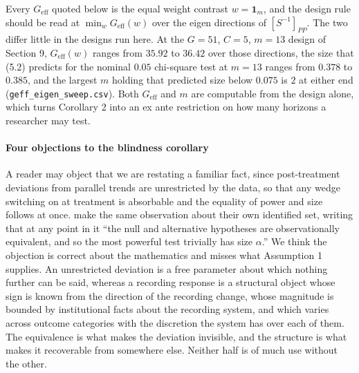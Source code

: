 \documentclass[12pt]{article}
\theoremstyle{definition}
\numberwithin{equation}{section}
\begin{document}
Every $G_{\mathrm{eff}}$ quoted below is the equal weight contrast
$w = \mathbf{1}_m$, and the design rule should be read at
$\min_w G_{\mathrm{eff}}(w)$ over the eigen directions of $[S^{-1}]_{PP}$. The
two differ little in the designs run here. At the $G = 51$, $C = 5$, $m = 13$
design of Section 9, $G_{\mathrm{eff}}(w)$ ranges from $35.92$ to
$36.42$ over those directions, the size that (5.2) predicts for the
nominal $0.05$ chi-square test at $m = 13$ ranges from $0.378$ to $0.385$, and
the largest $m$ holding that predicted size below $0.075$ is $2$ at either end
(\texttt{geff\_eigen\_sweep.csv}). Both $G_{\mathrm{eff}}$ and $m$ are
computable from the design alone, which
turns Corollary 2 into an ex ante restriction on how many horizons
a researcher may test.

\paragraph{Four objections to the blindness corollary}

A reader may object that we are restating a familiar fact, since post-treatment deviations from parallel trends are unrestricted by the data, so that any wedge
switching on at treatment is absorbable and the equality of power and size
follows at once. \citet{rambachan2023credible} make the same observation about their own
identified set, writing that at any point in it ``the null and alternative
hypotheses are observationally equivalent, and so the most powerful test trivially
has size $\alpha$.'' We think the objection is correct about the mathematics and misses what
Assumption 1 supplies. An unrestricted deviation is a free parameter
about which nothing further can be said, whereas a recording response is a
structural object whose sign is known from the direction of the recording
change, whose magnitude is bounded by institutional facts about the recording
system, and which varies across outcome categories with the discretion the
system has over each of them. The equivalence is what makes the deviation
invisible, and the structure is what makes it recoverable from somewhere else.
Neither half is of much use without the other.
\end{document}
